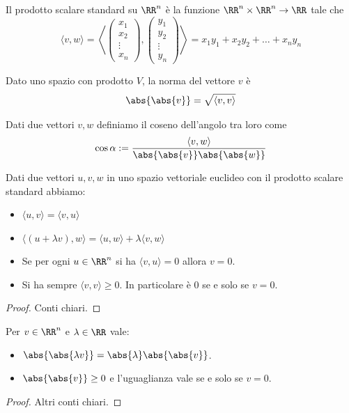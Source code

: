 \documentclass[11pt]{scrartcl}
\begin{document}
   	 \begin{definition}
   	 	Il prodotto scalare standard su $\RR^n$ è la funzione $\RR^n\times \RR^n \to \RR$ tale che 
   	 	$$\langle v,w\rangle=\left\langle\begin{pmatrix}
   	 		x_1 \\
   	 		x_2 \\
   	 		\vdots \\
   	 		x_n
   	 	\end{pmatrix},\begin{pmatrix}
   	 	y_1 \\
   	 	y_2 \\
   	 	\vdots \\
   	 	y_n
   	 	\end{pmatrix}\right\rangle=x_1y_1+x_2y_2+\dots+x_ny_n$$
   	 \end{definition}
   	 \begin{definition}
   	 	Dato uno spazio con prodotto $V$, la norma del vettore $v$ è
   	 	$$\abs{\abs{v}}=\sqrt{\langle v,v\rangle}$$
   	 \end{definition}
   	 \begin{definition}
   	 	Dati due vettori $v,w$ definiamo il coseno dell'angolo tra loro come
   	 	$$\cos \alpha:=\frac{\langle v,w \rangle }{\abs{\abs{v}}\abs{\abs{w}}}$$
   	 \end{definition}
   	 
   	 \begin{proposition}
   	 	Dati due vettori $u,v,w$ in uno spazio vettoriale euclideo con il prodotto scalare standard abbiamo:
   	 	\begin{itemize}
   	 		\item $\langle u,v \rangle =\langle v,u \rangle$
   	 		\item $\langle (u+\lambda v),w\rangle =\langle u,w\rangle + \lambda\langle v,w\rangle$
   	 		\item Se per ogni $u\in\RR^n$ si ha $\langle v,u\rangle=0$ allora $v=0$.
   	 		\item Si ha sempre $\langle v,v\rangle\ge 0$. In particolare è $0$ se e solo se $v=0$. 
   	 	\end{itemize}
   	 \end{proposition}
   	 \begin{proof}
   	 	Conti chiari.
   	 \end{proof}
   	 \begin{proposition}
   	 	Per $v\in\RR^n$ e $\lambda\in \RR$ vale:
   	 	\begin{itemize}
   	 		\item $\abs{\abs{\lambda v}}=\abs{\lambda}\abs{\abs{v}}$.
   	 		\item $\abs{\abs{v}}\ge 0$ e l'uguaglianza vale se e solo se $v=0$.
   	 	\end{itemize}
   	 \end{proposition}
   	 \begin{proof}
   	 	Altri conti chiari.
   	 \end{proof}
   	 
\end{document}

